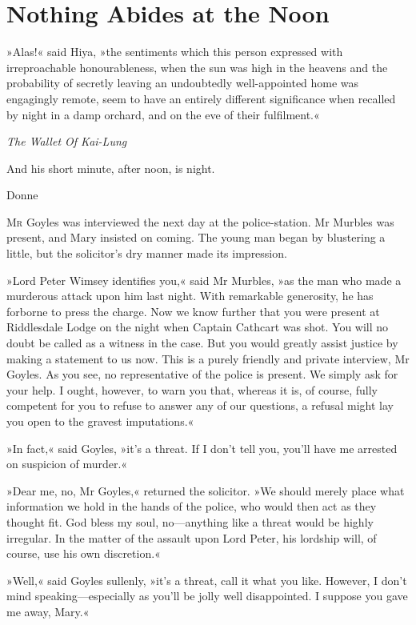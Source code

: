 

\chapter{Nothing Abides at the Noon}


\epigraph{»Alas!« said Hiya, »the sentiments which this person expressed with irreproachable honourableness, when the sun was high in the heavens and the probability of secretly leaving an undoubtedly well-appointed home was engagingly remote, seem to have an entirely different significance when recalled by night in a damp orchard, and on the eve of their fulfilment.«}{\textit{The Wallet Of Kai-Lung}}

\epigraph{And his short minute, after noon, is night.}{Donne}


\lettrine[lines=4]{M}{r} Goyles was interviewed the next day at the police-station. Mr  Murbles was present, and Mary insisted on coming. The young man began by blustering a little, but the solicitor's dry manner made its impression.

»Lord Peter Wimsey identifies you,« said Mr Murbles, »as the man who made a murderous attack upon him last night. With remarkable generosity, he has forborne to press the charge. Now we know further that you were present at Riddlesdale Lodge on the night when Captain Cathcart was shot. You will no doubt be called as a witness in the case. But you would greatly assist justice by making a statement to us now. This is a purely friendly and private interview, Mr Goyles.  As you see, no representative of the police is present. We simply ask for your help. I ought, however, to warn you that, whereas it is, of course, fully competent for you to refuse to answer any of our questions, a refusal might lay you open to the gravest imputations.«

»In fact,« said Goyles, »it's a threat. If I don't tell you, you'll have me arrested on suspicion of murder.«

»Dear me, no, Mr Goyles,« returned the solicitor. »We should merely place what information we hold in the hands of the police, who would then act as they thought fit. God bless my soul, no\allowbreak---\allowbreak anything like a threat would be highly irregular. In the matter of the assault upon Lord Peter, his lordship will, of course, use his own discretion.«

»Well,« said Goyles sullenly, »it's a threat, call it what you like.  However, I don't mind speaking\allowbreak---\allowbreak especially as you'll be jolly well disappointed. I suppose you gave me away, Mary.«

